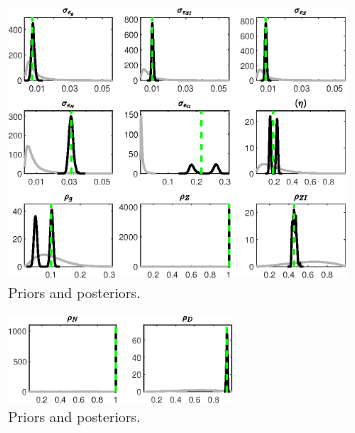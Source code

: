  
\begin{figure}[H]
\centering
\includegraphics[width=0.80\textwidth]{BRS_growth_sep/Output/BRS_growth_sep_PriorsAndPosteriors1}
\caption{Priors and posteriors.}\label{Fig:PriorsAndPosteriors:1}
\end{figure}
 
\begin{figure}[H]
\centering
\includegraphics[width=0.53\textwidth]{BRS_growth_sep/Output/BRS_growth_sep_PriorsAndPosteriors2}
\caption{Priors and posteriors.}\label{Fig:PriorsAndPosteriors:2}
\end{figure}
 
